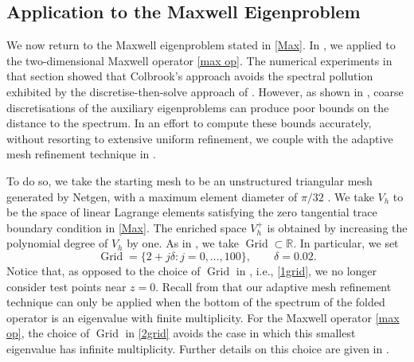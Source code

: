 
\subsection{Application to the Maxwell Eigenproblem}\label{DWRMatt}

We now return to the Maxwell eigenproblem stated in \eqref{Max}. In , we applied  to the two-dimensional Maxwell operator \eqref{max op}. The numerical experiments in that section 
showed that Colbrook's approach avoids the spectral pollution exhibited by the discretise-then-solve approach of . However, as shown in , coarse discretisations of the auxiliary eigenproblems can produce poor bounds on the distance to the spectrum. In an effort to compute these bounds accurately, without resorting to extensive uniform refinement, we couple  with the adaptive mesh refinement technique in .

To do so, we take the starting mesh to be an unstructured triangular mesh generated by Netgen, with a maximum element diameter of $\pi/32$ \cite{Schoberl1997}. We take $V_h$ to be the space of linear Lagrange elements satisfying the zero tangential trace boundary condition in \eqref{Max}. The enriched space $V_h^+$ is obtained by increasing the polynomial degree of $V_h$ by one. As in , we take $\operatorname{Grid} \subset \mathbb{R}.$ In particular, we set
\begin{equation} \label{2grid}
    \operatorname{Grid} = \{2 + j\delta : j = 0, \dots, 100\}, \qquad \delta = 0.02.
\end{equation}
Notice that, as opposed to the choice of $\operatorname{Grid}$ in , i.e., \eqref{1grid}, we no longer consider test points near $z=0.$ Recall from  that our adaptive mesh refinement technique can only be applied when the bottom of the spectrum of the folded operator is an eigenvalue with finite multiplicity. For the Maxwell operator \eqref{max op}, the choice of $\operatorname{Grid}$ in \eqref{2grid} avoids the case in which this smallest eigenvalue has infinite multiplicity. Further details on this choice are given in .




